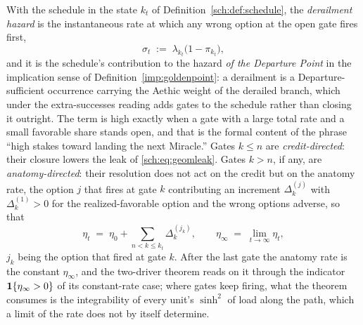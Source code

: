 \begin{definition}\label{sch:def:derailment}
With the schedule in the state $k_t$ of Definition~\ref{sch:def:schedule},
the \emph{derailment hazard} is the instantaneous rate at which any
wrong option at the open gate fires first,
\begin{equation}\label{sch:eq:derailment}
\sigma_t\;:=\;\lambda_{k_t}\bigl(1-\pi_{k_t}\bigr),
\end{equation}
and it is the schedule's contribution to the hazard \emph{of the
Departure Point} in the implication sense of
Definition~\ref{imp:goldenpoint}: a derailment is a Departure-sufficient
occurrence carrying the Aethic weight of the derailed branch, which
under the extra-successes reading adds gates to the schedule rather
than closing it outright. The term is high exactly when a gate with a
large total rate and a small favorable share stands open, and that is
the formal content of the phrase ``high stakes toward landing the next
Miracle.'' Gates $k\le n$ are \emph{credit-directed}: their closure
lowers the leak of \eqref{sch:eq:geomleak}. Gates $k>n$, if any, are
\emph{anatomy-directed}: their resolution does not act on the credit
but on the anatomy rate, the option $j$ that fires at gate $k$ contributing
an increment $\Delta_{k}^{(j)}$ with $\Delta_{k}^{(1)}>0$ for the
realized-favorable option and the wrong options adverse, so that
\begin{equation}\label{sch:eq:rhoprocess}
\eta_t\;=\;\eta_0+\sum_{n<k\le k_t}\Delta_{k}^{(j_k)},
\qquad
\eta_\infty\;=\;\lim_{t\to\infty}\eta_t,
\end{equation}
$j_k$ being the option that fired at gate $k$. After the last gate the anatomy rate is the constant $\eta_\infty$, and the two-driver theorem reads on it through the indicator $\mathbf{1}\{\eta_\infty>0\}$ of its constant-rate case; where gates keep firing, what the theorem consumes is the integrability of every unit's $\sinh^2$ of load along the path, which a limit of the rate does not by itself determine.
\end{definition}

